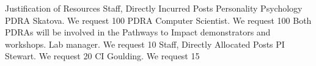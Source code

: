 Justification of Resources
Staff, Directly Incurred Posts
Personality Psychology PDRA Skatova. We request 100%
PDRA Computer Scientist. We request 100%
Both PDRAs will be involved in the Pathways to Impact demonstrators and workshops.
Lab manager. We request 10%
Staff, Directly Allocated Posts
PI Stewart. We request 20%
CI Goulding. We request 15%
